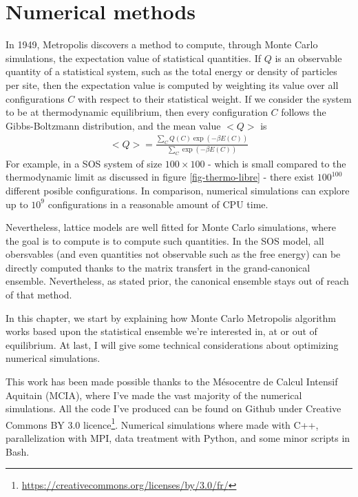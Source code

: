 \chapter{Numerical methods}
\label{chap-sim}

In 1949, Metropolis \cite{metropolis_monte_1949} discovers a method to compute, through Monte Carlo simulations, the expectation value of statistical quantities. If $Q$ is an observable quantity of a statistical system, such as the total energy or density of particles per site, then the expectation value is computed by weighting its value over all configurations $C$ with respect to their statistical weight. If we consider the system to be at thermodynamic equilibrium, then every configuration $C$ follows the Gibbs-Boltzmann distribution, and the mean value $<Q>$ is
\begin{align}
    <Q> = \frac{\sum_{C} Q(C) \exp(-\beta E(C))}{\sum_{C} \exp(-\beta E(C))}
\end{align}
For example, in a SOS system of size $100\times100$ - which is small compared to the thermodynamic limit as discussed in figure \ref{fig-thermo-libre} - there exist $100^{100}$ different posible configurations. In comparison, numerical simulations can explore up to $10^9$ configurations in a reasonable amount of CPU time.

Nevertheless, lattice models are well fitted for Monte Carlo simulations, where the goal is to compute is to compute such quantities. In the SOS model, all obersvables (and even quantities not observable such as the free energy) can be directly computed thanks to the matrix transfert in the grand-canonical ensemble. Nevertheless, as stated prior, the canonical ensemble stays out of reach of that method.

In this chapter, we start by explaining how Monte Carlo Metropolis algorithm works based upon the statistical ensemble we're interested in, at or out of equilibrium.
At last, I will give some technical considerations about optimizing numerical simulations.

This work has been made possible thanks to the Mésocentre de Calcul Intensif Aquitain (MCIA)\cite{noauthor_mesocentre_nodate}, where I've made the vast majority of the numerical simulations.
All the code I've produced can be found on Github \cite{paul_gersberg_github_2020} under Creative Commons BY 3.0 licence\footnote{\url{https://creativecommons.org/licenses/by/3.0/fr/}}. Numerical simulations where made with C++, parallelization with MPI, data treatment with Python, and some minor scripts in Bash.

